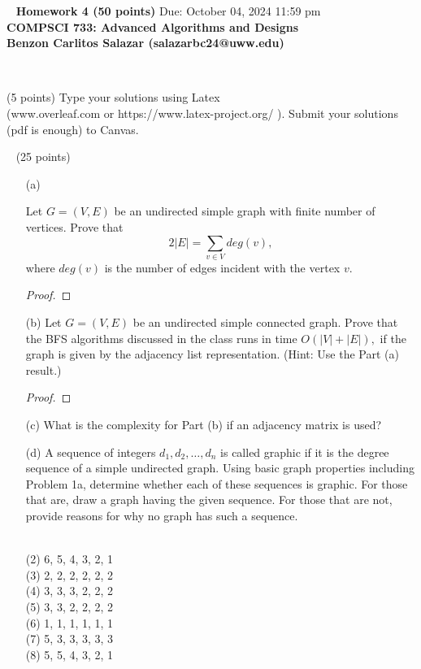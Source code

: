 \documentclass[12pt]{article}
\newcommand{\vs}{\vspace{2mm}}
\newcommand{\ls}{\vspace{5mm}}
\newcommand{\bc}{\begin{center}}
\newcommand{\ec}{\end{center}}
\begin{document}
\bc\ 
 { \bf Homework  4 (50 points)}  Due: October 04, 2024 11:59 pm\\
 { \bf COMPSCI 733: Advanced Algorithms and Designs } \\ 
 { \bf Benzon Carlitos Salazar (salazarbc24@uww.edu) } 
\ec\
\ls\

 (5 points)
Type your solutions using Latex \\
(www.overleaf.com or https://www.latex-project.org/ ). Submit your solutions (pdf is enough)  to Canvas. 

\vs\
\noindent{\bf Problem 1: } (25 points)
\vs\

\begin{itemize}

\item[(a)] 

Let $G = (V, E)$ be an undirected simple graph with finite number of vertices. Prove that 
\[ 2 |E| = \sum_{v \in V} deg(v), \]
where $deg(v)$ is the
number of edges incident with the vertex $v$.
 \ls\

\begin{proof}   

\end{proof}


\item[(b)] Let $G = (V, E)$ be an undirected simple connected  graph. Prove that  the BFS algorithms discussed in the class runs in time $O(|V|+|E|),$ if the graph is given by the adjacency list
representation. (Hint: Use the Part (a) result.)

\begin{proof}   

\end{proof}


\item[(c)] What is the complexity for Part (b) if an adjacency matrix is used?


\item[(d)]
 A sequence of integers $d_1, d_2, \ldots , d_n$ is called graphic if it is the degree
sequence of a simple undirected graph. Using basic graph properties including Problem 1a, determine whether each of these sequences is graphic. For those
that are, draw a graph having the given sequence. For those that are not, provide  reasons for why
no graph has such a sequence. 
\vs\

\\
(2) 6, 5, 4, 3, 2, 1 \\
(3) 2, 2, 2, 2, 2, 2 \\
(4) 3, 3, 3, 2, 2, 2 \\
(5) 3, 3, 2, 2, 2, 2 \\
(6) 1, 1, 1, 1, 1, 1 \\
(7) 5, 3, 3, 3, 3, 3 \\
(8) 5, 5, 4, 3, 2, 1 \\

\vs\
\end{itemize} 
 
\end{document}
